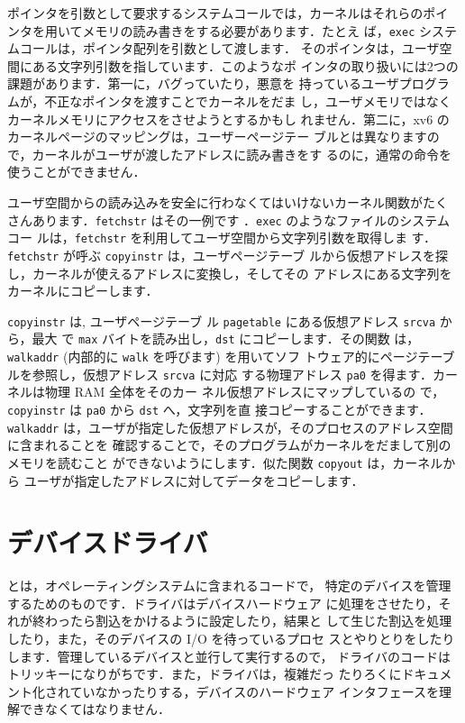 ポインタを引数として要求するシステムコールでは，カーネルはそれらのポイ
ンタを用いてメモリの読み書きをする必要があります．たとえ
ば，\texttt{exec} システムコールは，ポインタ配列を引数として渡します．
そのポインタは，ユーザ空間にある文字列引数を指しています．このようなポ
インタの取り扱いには2つの課題があります．第一に，バグっていたり，悪意を
持っているユーザプログラムが，不正なポインタを渡すことでカーネルをだま
し，ユーザメモリではなくカーネルメモリにアクセスをさせようとするかもし
れません．第二に，xv6 のカーネルページのマッピングは，ユーザーページテー
ブルとは異なりますので，カーネルがユーザが渡したアドレスに読み書きをす
るのに，通常の命令を使うことができません．

ユーザ空間からの読み込みを安全に行わなくてはいけないカーネル関数がたく
さんあります．\texttt{fetchstr} はその一例です
．\texttt{exec} のようなファイルのシステムコー
ルは，\texttt{fetchstr} を利用してユーザ空間から文字列引数を取得しま
す．\lstinline{fetchstr} が呼ぶ \lstinline{copyinstr} は，ユーザページテーブ
ルから仮想アドレスを探し，カーネルが使えるアドレスに変換し，そしてその
アドレスにある文字列をカーネルにコピーします．

\texttt{copyinstr} 
 は, ユーザページテーブ
ル \texttt{pagetable} にある仮想アドレス \texttt{srcva} から，最大
で \texttt{max} バイトを読み出し，\texttt{dst} にコピーします．その関数
は，\texttt{walkaddr} (内部的に \texttt{walk} を呼びます) を用いてソフ
トウェア的にページテーブルを参照し，仮想アドレス \texttt{srcva} に対応
する物理アドレス \texttt{pa0} を得ます．カーネルは物理 RAM 全体をそのカー
ネル仮想アドレスにマップしているの
で，\texttt{copyinstr} は \texttt{pa0} から \texttt{dst} へ，文字列を直
接コピーすることができます．\texttt{walkaddr} 
は，ユーザが指定した仮想アドレスが，そのプロセスのアドレス空間に含まれることを
確認することで，そのプログラムがカーネルをだまして別のメモリを読むこと
ができないようにします．似た関数 \texttt{copyout} は，カーネルから
ユーザが指定したアドレスに対してデータをコピーします．

\section{デバイスドライバ}

とは，オペレーティングシステムに含まれるコードで，
特定のデバイスを管理するためのものです．ドライバはデバイスハードウェア
に処理をさせたり，それが終わったら割込をかけるように設定したり，結果と
して生じた割込を処理したり，また，そのデバイスの I/O を待っているプロセ
スとやりとりをしたりします．管理しているデバイスと並行して実行するので，
ドライバのコードはトリッキーになりがちです．また，ドライバは，複雑だっ
たりろくにドキュメント化されていなかったりする，デバイスのハードウェア
インタフェースを理解できなくてはなりません．

